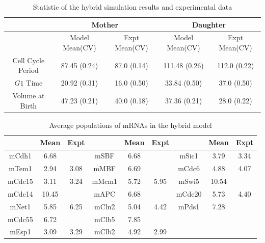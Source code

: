 \documentclass[12pt]{article}
\begin{document}
\begin{table}[H]
  \centering
  \caption{Statistic of the hybrid simulation results and experimental data}
  \vspace{0.2in}
  \begin{tabular}{|c|c|c|c|c|}
  \hline 
    \multirow{2}{*}{ } & 
    \multicolumn{2}{c|}{Mother} & 
    \multicolumn{2}{c|}{Daughter} \\
  \hline
    & Model Mean(CV) & Expt Mean(CV) & Model Mean(CV) & Expt Mean(CV) \\
  \hline
  \hline
  Cell Cycle Period & 87.45 (0.24)   &  87.0 (0.14)  & 111.48 (0.26) & 112.0 (0.22) \\
  $G1$ Time         & 20.92 (0.31)   &  16.0 (0.50)  & 33.84 (0.50)  & 37.0 (0.50)  \\
  Volume at Birth   & 47.23 (0.21)   &  40.0 (0.18)  & 37.36 (0.21)  & 28.0 (0.22)  \\
  \hline
  \end{tabular}
  \label{tab:determ_periods}
\end{table}

\begin{table}[H]
  \centering
  \caption{Average populations of mRNAs in the hybrid model}
  \vspace{0.2in}
  \begin{tabular}{|c|cc|c|cc|c|cc|}
  \hline
   & Mean & Expt &  & Mean & Expt &  & Mean & Expt\\
  \hline
  \hline
  mCdh1 &  6.68 &       &   mSBF  &  6.68 &       &   mSic1 &  3.79 & 3.34 \\
  mTem1 &  2.94 & 3.08  &   mMBF  &  6.69 &       &   mCdc6 &  4.88 & 4.07 \\
 mCdc15 &  3.11 & 3.24  &   mMcm1 &  5.72 & 5.95  &   mSwi5 & 10.54 &      \\
 mCdc14 & 10.45 &       &   mAPC  &  6.68 &       &  mCdc20 &  5.73 & 4.40 \\
  mNet1 &  5.85 & 6.25  &   mCln2 &  5.04 & 4.42  &   mPds1 &  7.28 &      \\
mCdc55  &  6.72 &       &   mClb5 &  7.85 &       &         &       &      \\
  mEsp1 &  3.09 & 3.29  &   mClb2 &  4.92 & 2.99  &         &       &      \\
  \hline
  \end{tabular}
  \label{tab:average_mRNA}
\end{table}
\end{document}
